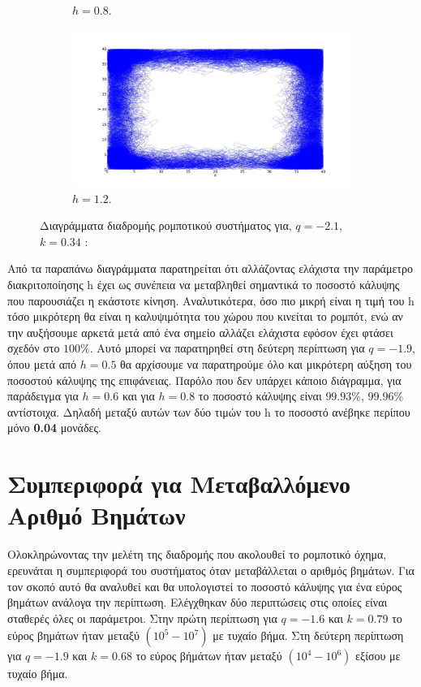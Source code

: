 \begin{figure}[ht]
\begin{subfigure}[b]{0.55\textwidth}
		\caption{$h =0.8$.}
		\label{f:g106}
	\end{subfigure}
	\hfill
	\begin{subfigure}[b]{0.55\textwidth}
		\centering
		\includegraphics[width=\textwidth]{LateX images/log/h/g4-2.1}
		\caption{$h =1.2$.}
		\label{f:g107}
	\end{subfigure}
	\hfill
	\caption{Διαγράμματα διαδρομής ρομποτικού συστήματος για, $q = -2.1$, $k = 0.34$ :}
\end{figure}

Από τα παραπάνω διαγράμματα παρατηρείται ότι αλλάζοντας ελάχιστα την παράμετρο διακριτοποίησης h έχει ως συνέπεια να μεταβληθεί σημαντικά το ποσοστό κάλυψης που παρουσιάζει η εκάστοτε κίνηση. Αναλυτικότερα, όσο πιο μικρή είναι η τιμή του h τόσο μικρότερη θα είναι η καλυψιμότητα του χώρου που κινείται το ρομπότ, ενώ αν την αυξήσουμε αρκετά μετά από ένα σημείο αλλάζει ελάχιστα εφόσον έχει φτάσει σχεδόν στο $100\%$. Αυτό μπορεί να παρατηρηθεί στη δεύτερη περίπτωση για $q = -1.9$, όπου μετά από $h = 0.5$ θα αρχίσουμε να παρατηρούμε όλο και μικρότερη αύξηση του ποσοστού κάλυψης της επιφάνειας. Παρόλο που δεν υπάρχει κάποιο διάγραμμα, για παράδειγμα για $h = 0.6$ και για $h = 0.8$ το ποσοστό κάλυψης είναι $99.93\%$,  $99.96\%$ αντίστοιχα. Δηλαδή μεταξύ αυτών των δύο τιμών του h το ποσοστό ανέβηκε περίπου μόνο \textbf{0.04} μονάδες.

\clearpage

\section{Συμπεριφορά για Μεταβαλλόμενο Αριθμό Βημάτων}
\label{sec:g5}
Ολοκληρώνοντας την μελέτη της διαδρομής που ακολουθεί το ρομποτικό όχημα, ερευνάται η συμπεριφορά του συστήματος όταν μεταβάλλεται ο αριθμός βημάτων. Για τον σκοπό αυτό θα αναλυθεί και θα υπολογιστεί το ποσοστό κάλυψης για ένα εύρος βημάτων ανάλογα την περίπτωση. Ελέγχθηκαν δύο περιπτώσεις στις οποίες είναι σταθερές όλες οι παράμετροι. Στην πρώτη περίπτωση για $q = -1.6$ και $k = 0.79$ το εύρος βημάτων ήταν μεταξύ $(10^5-10^7)$ με τυχαίο βήμα.
Στη δεύτερη περίπτωση για $q = -1.9$ και $k = 0.68$ το εύρος βήμάτων ήταν μεταξύ $(10^4-10^6)$ εξίσου με τυχαίο βήμα.

